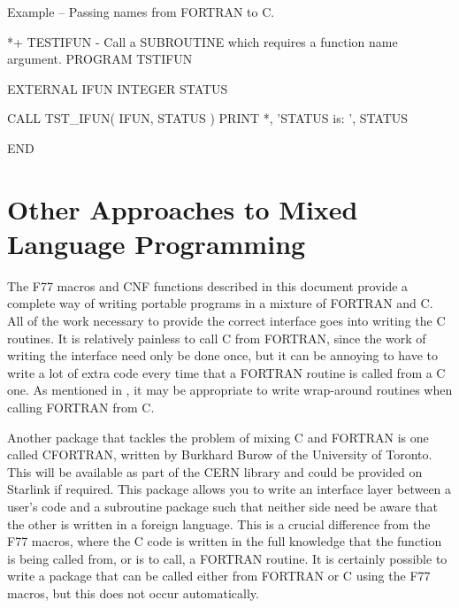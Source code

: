 \documentclass[twoside,11pt,nolof]{starlink}
\newcounter{examples}
\begin{document}
\label{cook_nameftoc}
\begin{center}
Example\latex{~\ref{cook_nameftoc}}
-- Passing names from FORTRAN to C.
\end{center}

\begin{small}
\begin{terminalv}
*+ TESTIFUN - Call a SUBROUTINE which requires a function name argument.
      PROGRAM TSTIFUN

      EXTERNAL IFUN
      INTEGER STATUS

      CALL TST_IFUN( IFUN, STATUS )
      PRINT *, 'STATUS is: ', STATUS

      END
\end{terminalv}
\end{small}
\begin{small}
\begin{terminalv}
#include "f77.h"

F77_INTEGER_FUNCTION(ifun)();

F77_SUBROUTINE(tst_ifun)(INTEGER_FUNCTION(name), INTEGER(status) ){

GENPTR_INTEGER_FUNCTION(name)
GENPTR_INTEGER(status)

*status = F77_EXTERNAL_NAME(name)( INTEGER_ARG(status) );
\end{terminalv}
\end{small}


\section{Other Approaches to Mixed Language Programming}

The F77 macros and CNF functions described in this document provide a
complete way of writing portable programs in a mixture of FORTRAN and C\@.
All of the work necessary to provide the correct interface goes into writing
the C routines. It is relatively painless to call C from FORTRAN, since the
work of writing the interface need only be done once, but it can be annoying to
have to write a lot of extra code every time that a FORTRAN routine is called
from a C one.
As mentioned in
, it may be appropriate to write
wrap-around routines when calling FORTRAN from C\@.

Another package that tackles the problem of mixing C and FORTRAN is one called
CFORTRAN, written by Burkhard Burow of the University of Toronto. This will be
available as part of the CERN library and could be provided on Starlink if
required. This package allows you to write an interface layer between a user's
code and a subroutine package such that neither side need be aware that the
other is written in a foreign language. This is a crucial difference from the
F77 macros, where the C code is written in the full knowledge that the function
is being called from, or is to call, a FORTRAN routine. It is certainly
possible to write a package that can be called either from FORTRAN or C using
the F77 macros, but this does not occur automatically.
\end{document}
